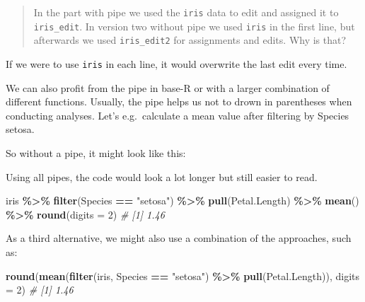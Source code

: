 \documentclass[
]{book}
\newenvironment{Shaded}{\begin{snugshade}}{\end{snugshade}}
\newcommand{\AttributeTok}[1]{\textcolor[rgb]{0.13,0.29,0.53}{#1}}
\newcommand{\CommentTok}[1]{\textcolor[rgb]{0.56,0.35,0.01}{\textit{#1}}}
\newcommand{\DecValTok}[1]{\textcolor[rgb]{0.00,0.00,0.81}{#1}}
\newcommand{\FunctionTok}[1]{\textcolor[rgb]{0.13,0.29,0.53}{\textbf{#1}}}
\newcommand{\NormalTok}[1]{#1}
\newcommand{\SpecialCharTok}[1]{\textcolor[rgb]{0.81,0.36,0.00}{\textbf{#1}}}
\newcommand{\StringTok}[1]{\textcolor[rgb]{0.31,0.60,0.02}{#1}}
\begin{document}
\begin{quote}
In the part with pipe we used the \texttt{iris} data to edit and assigned it to \texttt{iris\_edit}.
In version two without pipe we used \texttt{iris} in the first line, but afterwards we used \texttt{iris\_edit2} for assignments and edits.
Why is that?
\end{quote}

If we were to use \texttt{iris} in each line, it would overwrite the last edit every time.

We can also profit from the pipe in base-R or with a larger combination of different functions.
Usually, the pipe helps us not to drown in parentheses when conducting analyses.
Let's e.g.~calculate a mean value after filtering by Species setosa.

So without a pipe, it might look like this:

\begin{Shaded}
\end{Shaded}

Using all pipes, the code would look a lot longer but still easier to read.

\begin{Shaded}
\begin{Highlighting}[]
\NormalTok{iris }\SpecialCharTok{\%\textgreater{}\%} 
\FunctionTok{filter}\NormalTok{(Species }\SpecialCharTok{==} \StringTok{"setosa"}\NormalTok{) }\SpecialCharTok{\%\textgreater{}\%} 
\FunctionTok{pull}\NormalTok{(Petal.Length) }\SpecialCharTok{\%\textgreater{}\%}
\FunctionTok{mean}\NormalTok{() }\SpecialCharTok{\%\textgreater{}\%} \FunctionTok{round}\NormalTok{(}\AttributeTok{digits =} \DecValTok{2}\NormalTok{)}
\CommentTok{\# [1] 1.46}
\end{Highlighting}
\end{Shaded}

As a third alternative, we might also use a combination of the approaches, such as:

\begin{Shaded}
\begin{Highlighting}[]
\FunctionTok{round}\NormalTok{(}\FunctionTok{mean}\NormalTok{(}\FunctionTok{filter}\NormalTok{(iris, Species }\SpecialCharTok{==} \StringTok{"setosa"}\NormalTok{) }\SpecialCharTok{\%\textgreater{}\%} \FunctionTok{pull}\NormalTok{(Petal.Length)), }\AttributeTok{digits =} \DecValTok{2}\NormalTok{)}
\CommentTok{\# [1] 1.46}
\end{Highlighting}
\end{Shaded}
\end{document}

